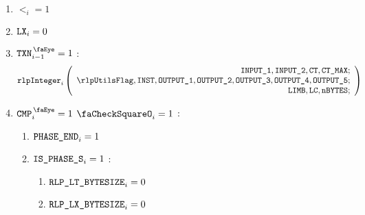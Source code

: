 \begin{center}
\end{center}
\begin{enumerate}
    \item $\lt_{i} =1$
    \item $\texttt{LX}_{i} =0$
    \item \If $\isTxn_{i-1} =1$ \Then:
        \[
            \rlpInteger_{i}
            \left(
            \begin{array}{r}
                \inputColumn{1},
                \inputColumn{2},
                \ct,
                \maxCt; \\
                \rlpUtilsFlag,
                \INST,
                \outputColumn{1},
                \outputColumn{2},
                \outputColumn{3},
                \outputColumn{4},
                \outputColumn{5}; \\
                \limb,
                \lc,
                \limbsize; \\
            \end{array}
            \right)
        \]
    \item \If $\isCmp_{i} =1$ \et $\done_{i}=1$ \Then:
        \begin{enumerate}
            \item $\texttt{PHASE\_END}_{i}=1$
            \item \If $\texttt{IS\_PHASE\_S}_{i}=1$ \Then:
                \begin{enumerate}
                    \item $\texttt{RLP\_LT\_BYTESIZE}_{i} = 0$
                    \item $\texttt{RLP\_LX\_BYTESIZE}_{i} = 0$ 
                \end{enumerate}
        \end{enumerate}
\end{enumerate}

